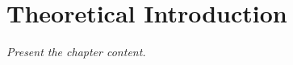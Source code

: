 
\chapter{Theoretical Introduction}
\label{cap:TheoreticalIntroduction}

\textit{Present the chapter content.}

%

%
%

